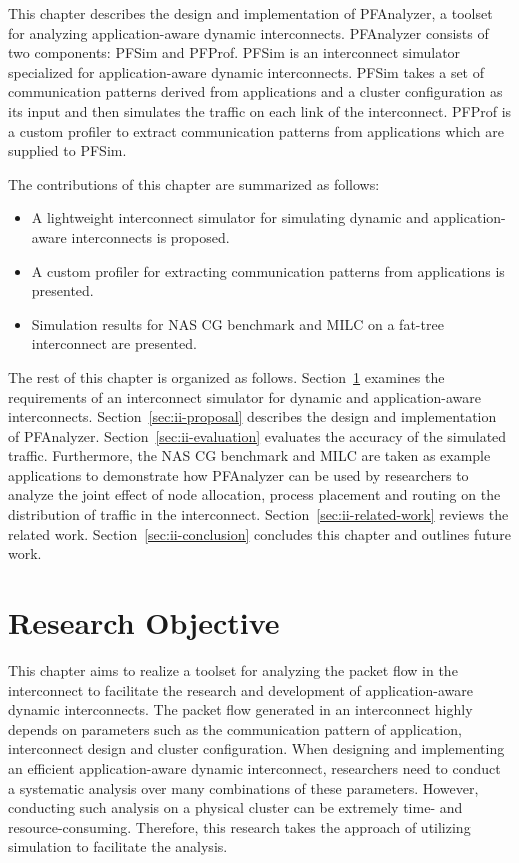 This chapter describes the design and implementation of PFAnalyzer, a
toolset for analyzing application-aware dynamic interconnects.
PFAnalyzer consists of two components: PFSim and PFProf. PFSim is an
interconnect simulator specialized for application-aware dynamic
interconnects. PFSim takes a set of communication patterns derived from
applications and a cluster configuration as its input and then simulates the
traffic on each link of the interconnect. PFProf is a custom profiler to
extract communication patterns from applications which are supplied to PFSim.

The contributions of this chapter are summarized as follows:

\begin{itemize}
\item
  A lightweight interconnect simulator for simulating dynamic and
  application-aware interconnects is proposed.
\item
  A custom profiler for extracting communication patterns from
  applications is presented.
\item
  Simulation results for NAS CG benchmark and MILC on a fat-tree
  interconnect are presented.
\end{itemize}

The rest of this chapter is organized as follows.
Section~\ref{sec:ii-objective} examines the requirements of an
interconnect simulator for dynamic and application-aware interconnects.
Section~\ref{sec:ii-proposal} describes the design and implementation of
PFAnalyzer. Section~\ref{sec:ii-evaluation} evaluates the accuracy of the
simulated traffic. Furthermore, the NAS CG benchmark and MILC are taken as
example applications to demonstrate how PFAnalyzer can be used by researchers
to analyze the joint effect of node allocation, process placement and routing
on the distribution of traffic in the interconnect.
Section~\ref{sec:ii-related-work} reviews the related work.
Section~\ref{sec:ii-conclusion} concludes this chapter and outlines future
work.

\section{Research Objective}\label{sec:ii-objective}

This chapter aims to realize a toolset for analyzing the packet flow in the
interconnect to facilitate the research and development of application-aware
dynamic interconnects. The packet flow generated in an interconnect highly
depends on parameters such as the communication pattern of application,
interconnect design and cluster configuration. When designing and implementing
an efficient application-aware dynamic interconnect, researchers need to
conduct a systematic analysis over many combinations of these parameters.
However, conducting such analysis on a physical cluster can be extremely time-
and resource-consuming. Therefore, this research takes the approach of
utilizing simulation to facilitate the analysis.

